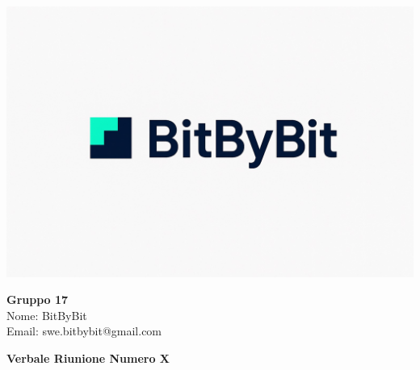 \documentclass[a4paper,12pt]{article}
\begin{document}
\begin{center}
    \begin{minipage}{0.25\textwidth}
        \centering
        \includegraphics[width=\linewidth]{logo.png}
    \end{minipage}
    \hfill
    \begin{minipage}{0.7\textwidth}
        \raggedright
        {\LARGE \textbf{Gruppo 17}}\\[0.3cm]
        {\large
        Nome: BitByBit\\
        Email: swe.bitbybit@gmail.com
        }
    \end{minipage}
\end{center}

\vspace{1.5cm}

\begin{center}
    {\LARGE \textbf{Verbale Riunione Numero X}}
\end{center}

\vspace*{\fill} %
\end{document}
